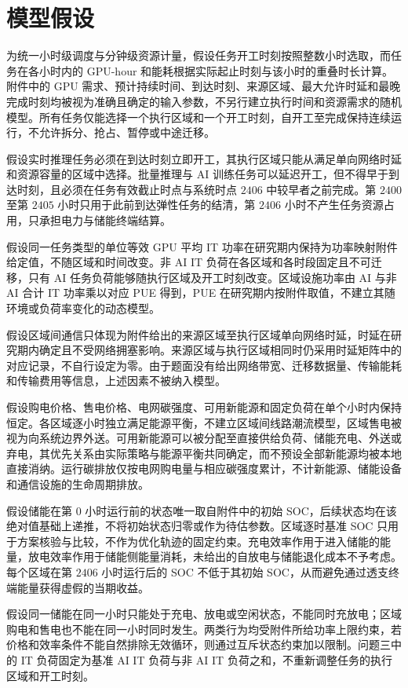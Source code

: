 \documentclass[withoutpreface,bwprint]{cumcmthesis}
\begin{document}
\section{模型假设}

为统一小时级调度与分钟级资源计量，假设任务开工时刻按照整数小时选取，而任务在各小时内的 GPU-hour 和能耗根据实际起止时刻与该小时的重叠时长计算。附件中的 GPU 需求、预计持续时间、到达时刻、来源区域、最大允许时延和最晚完成时刻均被视为准确且确定的输入参数，不另行建立执行时间和资源需求的随机模型。所有任务仅能选择一个执行区域和一个开工时刻，自开工至完成保持连续运行，不允许拆分、抢占、暂停或中途迁移。

假设实时推理任务必须在到达时刻立即开工，其执行区域只能从满足单向网络时延和资源容量的区域中选择。批量推理与 AI 训练任务可以延迟开工，但不得早于到达时刻，且必须在任务有效截止时点与系统时点 $2406$ 中较早者之前完成。第 $2400$ 至第 $2405$ 小时只用于此前到达弹性任务的结清，第 $2406$ 小时不产生任务资源占用，只承担电力与储能终端结算。

假设同一任务类型的单位等效 GPU 平均 IT 功率在研究期内保持为功率映射附件给定值，不随区域和时间改变。非 AI IT 负荷在各区域和各时段固定且不可迁移，只有 AI 任务负荷能够随执行区域及开工时刻改变。区域设施功率由 AI 与非 AI 合计 IT 功率乘以对应 PUE 得到，PUE 在研究期内按附件取值，不建立其随环境或负荷率变化的动态模型。

假设区域间通信只体现为附件给出的来源区域至执行区域单向网络时延，时延在研究期内确定且不受网络拥塞影响。来源区域与执行区域相同时仍采用时延矩阵中的对应记录，不自行设定为零。由于题面没有给出网络带宽、迁移数据量、传输能耗和传输费用等信息，上述因素不被纳入模型。

假设购电价格、售电价格、电网碳强度、可用新能源和固定负荷在单个小时内保持恒定。各区域逐小时独立满足能源平衡，不建立区域间线路潮流模型，区域售电被视为向系统边界外送。可用新能源可以被分配至直接供给负荷、储能充电、外送或弃电，其优先关系由实际策略与能源平衡共同确定，而不预设全部新能源均被本地直接消纳。运行碳排放仅按电网购电量与相应碳强度累计，不计新能源、储能设备和通信设施的生命周期排放。

假设储能在第 $0$ 小时运行前的状态唯一取自附件中的初始 SOC，后续状态均在该绝对值基础上递推，不将初始状态归零或作为待估参数。区域逐时基准 SOC 只用于方案核验与比较，不作为优化轨迹的固定约束。充电效率作用于进入储能的能量，放电效率作用于储能侧能量消耗，未给出的自放电与储能退化成本不予考虑。每个区域在第 $2406$ 小时运行后的 SOC 不低于其初始 SOC，从而避免通过透支终端能量获得虚假的当期收益。

假设同一储能在同一小时只能处于充电、放电或空闲状态，不能同时充放电；区域购电和售电也不能在同一小时同时发生。两类行为均受附件所给功率上限约束，若价格和效率条件不能自然排除无效循环，则通过互斥状态约束加以限制。问题三中的 IT 负荷固定为基准 AI IT 负荷与非 AI IT 负荷之和，不重新调整任务的执行区域和开工时刻。
\end{document}
